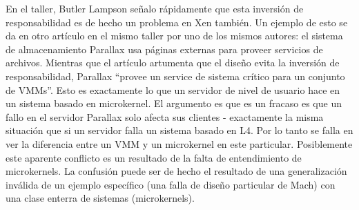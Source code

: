 En el taller, Butler Lampson señalo rápidamente que esta inversión de responsabilidad es de hecho un problema en Xen también. Un ejemplo de esto se da en otro artículo en el mismo taller por uno de los mismos autores: el sistema de almacenamiento Parallax usa páginas externas para proveer servicios de archivos. Mientras que el artículo artumenta que el diseño evita la inversión de responsabilidad, Parallax ``provee un service de sistema crítico para un conjunto de VMMs''. Esto es exactamente lo que un servidor de nivel de usuario hace en un sistema basado en microkernel. El argumento es que es un fracaso es que un fallo en el servidor Parallax solo afecta sus clientes - exactamente la misma situación que si un servidor falla un sistema basado en L4. Por lo tanto se falla en ver la diferencia entre un VMM y un microkernel en este particular. Posiblemente este aparente conflicto es un resultado de la falta de entendimiento de microkernels. La confusión puede ser de hecho el resultado de una generalización inválida de un ejemplo específico (una falla de diseño particular de Mach) con una clase enterra de sistemas (microkernels).

